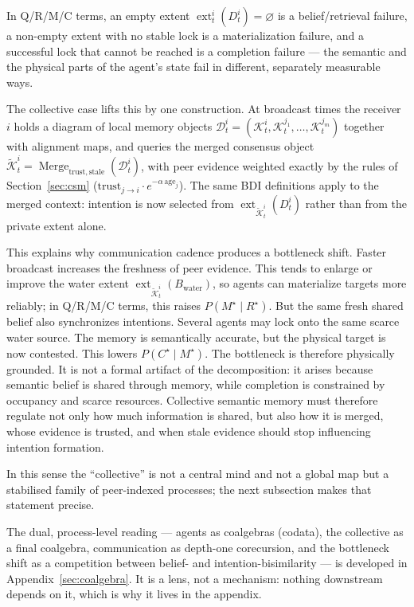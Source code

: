 \documentclass{article}
\begin{document}
In Q/R/M/C terms, an empty extent
$\operatorname{ext}_t^i(D_t^i)=\varnothing$ is a belief/retrieval
failure, a non-empty extent with no stable lock is a materialization
failure, and a successful lock that cannot be reached is a completion
failure --- the semantic and the physical parts of the agent's state
fail in different, separately measurable ways.

The collective case lifts this by one construction. At broadcast times
the receiver $i$ holds a diagram of local memory objects
$\mathcal{D}_t^i=(\mathcal{K}_t^i,\mathcal{K}_t^{j_1},\ldots,
\mathcal{K}_t^{j_m})$ together with alignment maps, and queries the
merged consensus object
$\widetilde{\mathcal{K}}_t^i=\operatorname{Merge}_{\mathrm{trust},
\mathrm{stale}}(\mathcal{D}_t^i)$, with peer evidence weighted exactly
by the rules of Section~\ref{sec:csm}
($\mathrm{trust}_{j\to i}\cdot e^{-\alpha\,\mathrm{age}_j}$). The same
BDI definitions apply to the merged context: intention is now selected
from $\operatorname{ext}_{\widetilde{\mathcal{K}}_t^i}(D_t^i)$ rather
than from the private extent alone.

This explains why communication cadence produces a bottleneck shift.
Faster broadcast increases the freshness of peer evidence. This tends
to enlarge or improve the water extent
$\operatorname{ext}_{\widetilde{\mathcal{K}}_t^i}(B_{\mathrm{water}})$,
so agents can materialize targets more reliably; in Q/R/M/C terms, this
raises $P(M^\star\mid R^\star)$. But the same fresh shared belief also
synchronizes intentions. Several agents may lock onto the same scarce
water source. The memory is semantically accurate, but the physical
target is now contested. This lowers $P(C^\star\mid M^\star)$. The
bottleneck is therefore physically grounded. It is not a formal
artifact of the decomposition: it arises because semantic belief is
shared through memory, while completion is constrained by occupancy and
scarce resources. Collective semantic memory must therefore regulate
not only how much information is shared, but also how it is merged,
whose evidence is trusted, and when stale evidence should stop
influencing intention formation.

In this sense the ``collective'' is not a central mind and not a global
map but a stabilised family of peer-indexed processes; the next
subsection makes that statement precise.

The dual, process-level reading --- agents as coalgebras (codata), the
collective as a final coalgebra, communication as depth-one
corecursion, and the bottleneck shift as a competition between belief-
and intention-bisimilarity --- is developed in
Appendix~\ref{sec:coalgebra}. It is a lens, not a mechanism: nothing
downstream depends on it, which is why it lives in the appendix.
\end{document}
